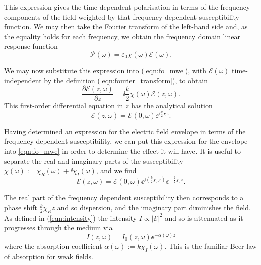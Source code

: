     This expression gives the time-dependent polarisation in terms of the
    frequency components of the field weighted by that frequency-dependent
    susceptibility function. We may then take the Fourier transform of the 
    left-hand side and, as the equality holds for each frequency, we obtain the
    frequency domain linear response function
    \begin{equation}\label{eqn:lin_pol_freq} 
      \mathcal{P}(\omega) = \varepsilon_0 \chi(\omega) \mathcal{E}(\omega).
    \end{equation}

    We may now substitute this expression into (\ref{eqn:fo_mwe}), with
    $\mathcal{E}(\omega)$ time-independent by the definition
    (\ref{eqn:fourier_transform}), to obtain
    \begin{equation}\label{eqn:fo_mwe_linear}
      \frac{\partial \mathcal{E}(z, \omega)}{\partial z} = 
      \ii \frac{k}{2} \chi(\omega) \mathcal{E}(z, \omega).
    \end{equation}
    This first-order differential equation in $z$ has the analytical solution 
    \begin{equation}
      \mathcal{E}(z, \omega) = \mathcal{E}(0, \omega) \ee^{\ii \tfrac{k}{2} \chi z}.
    \end{equation}

    Having determined an expression for the electric field envelope in terms of
    the frequency-dependent susceptibility, we can put this expression for the
    envelope into \ref{eqn:fo_mwe} in order to determine the effect it will
    have. It is useful to separate the real and imaginary parts of the
    susceptibility $\chi(\omega) := \chi_R(\omega) + \ii \chi_I(\omega)$, and we
    find
    \begin{equation}\label{eqn:efield_susc_real_imag}
      \mathcal{E}(z, \omega) = 
      \mathcal{E}(0, \omega)    
      \ee^{\ii(\frac{k}{2} \chi_R z)} 
      \ee^{- \frac{k}{2} \chi_I z}.
    \end{equation}

    The real part of the frequency dependent susceptibility then corresponds to
    a phase shift $\frac{k}{2} \chi_R z$ and so dispersion, and the imaginary
    part diminishes the field. As defined in (\ref{eqn:intensity}) the intensity
    $I \propto |\mathcal{E}|^2$ and so is attenuated as it progresses through
    the medium via
    \begin{equation}\label{eqn:beer_law}
      I(z, \omega) = I_0(z, \omega) \ee^{-\alpha(\omega) z}
    \end{equation}
    where the absorption coefficient $\alpha(\omega) := k \chi_I(\omega)$. This
    is the familiar Beer law of absorption for weak fields.
    

